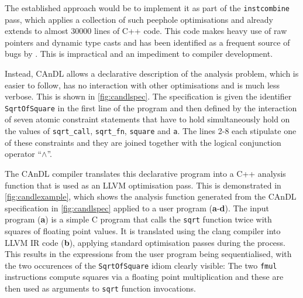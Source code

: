     The established approach would be to implement it as part of the
    \texttt{instcombine} pass, which applies a collection of such peephole
    optimisations and already extends to almost 30000 lines of C++ code.
    This code makes heavy use of raw pointers and dynamic type casts and has
    been identified as a frequent source of bugs by
    \citet{Yang:2011:FUB:1993316.1993532, Menendez:2017:ADP:3062341.3062372}.
    This is impractical and an impediment to compiler development.

    Instead, CAnDL allows a declarative description of the analysis problem,
    which is easier to follow, has no interaction with other optimisations and
    is much less verbose.
    This is shown in \autoref{fig:candlspec}.
    The specification is given the identifier \texttt{SqrtOfSquare} in the
    first line of the program and then defined by the interaction of seven
    atomic constraint statements that have to hold simultaneously hold on the
    values of \texttt{sqrt\_call}, \texttt{sqrt\_fn}, \texttt{square} and
    \texttt{a}.
    The lines 2-8 each stipulate one of these constraints and they are joined
    together with the logical conjunction operator ``$\land$''.

    The CAnDL compiler translates this declarative program into a C++ analysis
    function that is used as an LLVM optimisation pass.
    This is demonstrated in \autoref{fig:candlexample}, which shows the analysis
    function generated from the CAnDL specification in \autoref{fig:candlspec}
    applied to a user program ({\bf a}-{\bf d}).
    The input program ({\bf a}) is a simple C program that calls the
    \texttt{sqrt} function twice with squares of floating point values.
    It is translated using the clang compiler into LLVM IR code ({\bf b}),
    applying standard optimisation passes during the process.
    This results in the expressions from the user program being sequentialised,
    with the two occurences of the \texttt{SqrtOfSquare} idiom clearly visible:
    The two \texttt{fmul} instructions compute squares via a floating point
    multiplication and these are then used as arguments to \texttt{sqrt}
    function invocations. 

